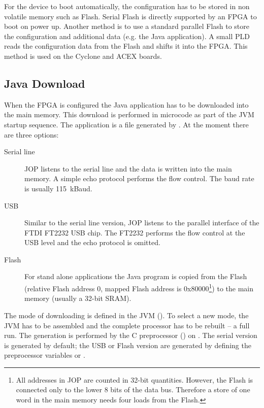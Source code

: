 For the device to boot automatically, the configuration has to be
stored in non volatile memory such as Flash. Serial Flash is directly
supported by an FPGA to boot on power up. Another method is to use a
standard parallel Flash to store the configuration and additional
data (e.g. the Java application). A small PLD reads the configuration
data from the Flash and shifts it into the FPGA. This method is used
on the Cyclone and ACEX boards.

\subsection{Java Download}

 When the FPGA is configured the Java
application has to be downloaded into the main memory. This download
is performed in microcode as part of the JVM startup sequence. The
application is a  file generated by . At the
moment there are three options:

\begin{description}
    \item[Serial line] JOP listens to the serial line and the
        data is written into the main memory. A simple echo
        protocol performs the flow control. The baud rate is
        usually 115~kBaud.
    \item[USB] Similar to the serial line version, JOP listens to
        the parallel interface of the FTDI FT2232 USB chip. The
        FT2232 performs the flow control at the USB level and the
        echo protocol is omitted.
    \item[Flash] For stand alone applications the Java program is
    copied from the Flash (relative Flash address 0, mapped Flash
    address is 0x80000\footnote{All addresses in JOP are counted in
    32-bit quantities. However, the Flash is connected only to the
    lower 8 bits of the data bus. Therefore a store of one word in
    the main memory needs four loads from the Flash.}) to the main
    memory (usually a 32-bit SRAM).
\end{description}


The mode of downloading is defined in the JVM (). To
select a new mode, the JVM has to be assembled and the complete
processor has to be rebuilt -- a full  run. The generation
is performed by the C preprocessor () on . The
serial version is generated by default; the USB or Flash version are
generated by defining the preprocessor variables  or
.

